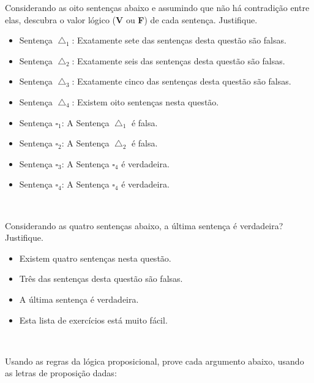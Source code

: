 \documentclass[a4paper, 12pt, addpoints]{exam}
\begin{document}
\begin{questions}
  \question Considerando as oito sentenças abaixo e assumindo que não há contradição entre elas, descubra o valor lógico (\textbf{V} ou \textbf{F}) de cada sentença. Justifique.
  
    \begin{itemize}
      \item Sentença $\bigtriangleup_1$: Exatamente sete das sentenças desta questão são falsas.
      \item Sentença $\bigtriangleup_2$: Exatamente seis das sentenças desta questão são falsas.
      \item Sentença $\bigtriangleup_3$: Exatamente cinco das sentenças desta questão são falsas.
      \item Sentença $\bigtriangleup_4$: Existem oito sentenças nesta questão.
      \item Sentença $\square_1$: A Sentença $\bigtriangleup_1$ é falsa.
      \item Sentença $\square_2$: A Sentença $\bigtriangleup_2$ é falsa.
      \item Sentença $\square_3$: A Sentença $\square_4$ é verdadeira.
      \item Sentença $\square_4$: A Sentença $\square_4$ é verdadeira.
    \end{itemize}
  

  \begin{resp}~
    
  \end{resp}

  \question  Considerando as quatro sentenças abaixo, a última sentença é verdadeira? Justifique.

  \begin{itemize}
    \item Existem quatro sentenças nesta questão.
    \item Três das sentenças desta questão são falsas.
    \item A última sentença é verdadeira.
    \item Esta lista de exercícios está muito fácil.
  \end{itemize}
  


  \begin{resp}~
  
  \end{resp}

  \question  Usando as regras da lógica proposicional, prove cada argumento abaixo, usando as letras de proposição dadas:
  

\end{questions}
\end{document}
